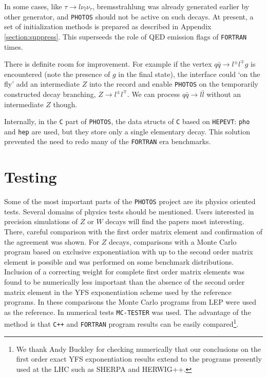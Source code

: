 \documentclass[]{Photos_interface_design}
\begin{document}
In some cases, like
$\tau \to l \nu_l \nu_\tau$, bremsstrahlung was already generated earlier
by other generator, and {\tt PHOTOS} should not be active on such decays.
At present,  a set of initialization methods is 
prepared as described in Appendix \ref{section:suppress}. This superseeds 
the role of QED emission flags of {\tt FORTRAN} times. 

There is definite room for 
improvement. For example if the vertex $q \bar q \to l^\pm l^\mp g$ is encountered
(note the presence of $g$ in the final state),
the interface could `on the fly' add an intermediate $Z$ into the record and enable {\tt PHOTOS}
on the temporarily constructed decay branching, $Z \to l^\pm l^\mp $. 
We can process $q\bar q \to l\bar l$ without an intermediate $Z$ though.


Internally, in the {\tt C} part of {\tt PHOTOS}, the data
structs of {\tt C}  based on {\tt HEPEVT}: {\tt pho} and {\tt hep} 
are used, but they store only a single elementary decay. 
This solution  prevented
the need to redo many of the {\tt FORTRAN} era benchmarks.






\section{Testing}
\label{sec:tests} 
 Some of the most important parts of the {\tt PHOTOS} project are its physics oriented tests.
Several domains
of physics tests should be mentioned. Users interested in precision 
simulations of $Z$ or $W$ decays  will 
find  the papers \cite{Nanava:2009vg,Golonka:2006tw,Golonka:2005pn}
most interesting. There, careful comparison with the first order matrix element 
and confirmation of the agreement was shown.
For $Z$ decays, comparisons  with a Monte Carlo program based on exclusive 
exponentiation with up to the second order matrix element
is possible and was performed on some benchmark distributions.
Inclusion of a correcting weight for complete first order matrix elements was found to be numerically less important
than the absence of the second order matrix element in the YFS exponentiation scheme used by the reference programs. 
In these comparisons the Monte Carlo programs from LEP 
\cite{koralz4:1994,kkcpc:1999} were used as the reference. In numerical tests {\tt MC-TESTER} \cite{Davidson:2008ma}
was used. The advantage of the method is that {\tt C++} and {\tt FORTRAN} program
results can be easily compared\footnote{We thank Andy Buckley for checking numerically
 that our conclusions on the first order exact YFS exponentiation results extend
to the programs presently used at the LHC such as  
SHERPA and HERWIG++.  }.
 
\end{document}

